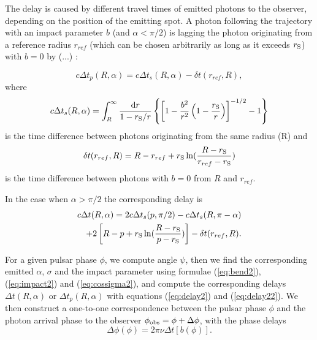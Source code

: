 \documentclass{wihuri}
\def\rg{r_{\rm S}} %
\def\be{\begin{equation}}
\def\ee{\end{equation}}
\def\d{{\rm d}}
\def\rg{r_{\rm S}} %
\def\phiobs{\phi_{\rm obs}}
\begin{document}
The delay is caused by different travel times of emitted
photons to the observer, depending on the position of the emitting spot.
A photon following the trajectory with an impact parameter $b$ (and $\alpha < \pi/2$)
is lagging the photon originating from a reference radius $r_{ref}$ (which can be chosen arbitrarily as long as it exceeds $\rg$) with $b=0$ by (...)%
:

\be \label{eq:delay2}
c\Delta t_{p}(R,\alpha)=  c\Delta t_{s}(R,\alpha) -\delta t(r_{ref},R),
\ee
where 
\be
c\Delta t_{s}(R,\alpha) =
\int_R^{\infty} \frac{\d r}{1- \rg/r}
\left\{ \left[ 1-  \frac{b^2}{r^2}  \left( 1- \frac{\rg}{r} \right)
\right] ^{-1/2}  -1 \right\}
\ee
is the time difference between photons originating from the same radius (R) and
\be
\delta t(r_{ref},R) = R-r_{ref}+\rg\ln(\frac{R-\rg}{r_{ref}-\rg})
\ee
is the time difference between photons with $b=0$ from $R$ and $r_{ref}$. 

In the case when $\alpha > \pi/2$ the corresponding delay is
\be\label{eq:delay22}
\begin{split}
c\Delta t(R,\alpha)= 2c\Delta t_{s}(p,\pi/2)-c\Delta t_{s}(R,\pi-\alpha)\\+2\left[ R-p+\rg\ln(\frac{R-\rg}{p-\rg})\right]-\delta t(r_{ref},R).
\end{split}
\ee

\iffalse
\be \label{eq:delay2}
\begin{split}
c\Delta t_{p}(R,\alpha)=  \int_R^{\infty} \frac{\d r}{1- \rg/r}
\left\{ \left[ 1-  \frac{b^2}{r^2}  \left( 1- \frac{\rg}{r} \right)
\right] ^{-1/2}  -1 \right\} \\ +\delta t(r_{ref},R),
\end{split}
\ee
where 
\be
\delta t(r_{ref},R) = R-r_{ref}+\rg\ln(\frac{R-\rg}{r_{ref}-\rg})
\ee
is the time difference between photons $b=0$ from $R$ and $r_{ref}$. 

In the case when $\alpha > \pi/2$ the corresponding delay is
\be\label{eq:delay22}
\begin{split}
c\Delta t(R,\alpha)= 2c\Delta t_{p}(p,\pi/2)-c\Delta t_{p}(R,\pi-\alpha)\\+4\left[ R-p+\rg\ln(\frac{R-\rg}{p-\rg})\right].
\end{split}
\ee

\fi

For a given pulsar phase $\phi$, we compute angle $\psi$, then
we find the corresponding emitted $\alpha$, $\sigma$ and the impact parameter
using  formulae (\ref{eq:bend2}), (\ref{eq:impact2}) and (\ref{eq:cossigma2}), and
  compute the corresponding  delays $\Delta t(R,\alpha)$ or $\Delta t_{p}(R,\alpha)$
with equations  (\ref{eq:delay2}) and (\ref{eq:delay22}).
We then construct a one-to-one
correspondence between the pulsar phase $\phi$ and
the photon arrival phase to the observer $\phiobs=\phi+ \Delta\phi$,
with the phase delays
\be \label{eq:deltaphi2}
\Delta \phi(\phi) =2\pi\nu \Delta t[b(\phi)] .
\ee
\end{document}
